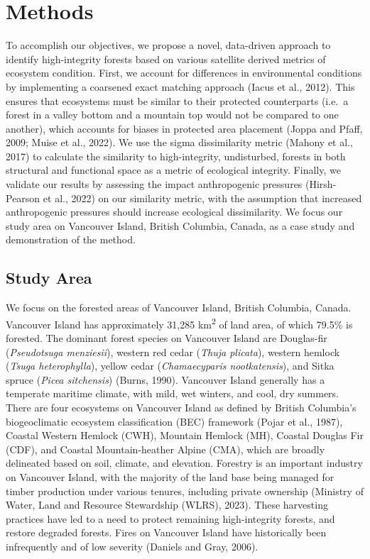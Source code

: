 \documentclass[
]{agujournal2019}
\begin{document}
\section{Methods}\label{methods}

To accomplish our objectives, we propose a novel, data-driven approach
to identify high-integrity forests based on various satellite derived
metrics of ecosystem condition. First, we account for differences in
environmental conditions by implementing a coarsened exact matching
approach (Iacus et al., 2012). This ensures that ecosystems must be
similar to their protected counterparts (i.e.~a forest in a valley
bottom and a mountain top would not be compared to one another), which
accounts for biases in protected area placement (Joppa and Pfaff, 2009;
Muise et al., 2022). We use the sigma dissimilarity metric (Mahony et
al., 2017) to calculate the similarity to high-integrity, undisturbed,
forests in both structural and functional space as a metric of
ecological integrity. Finally, we validate our results by assessing the
impact anthropogenic pressures (Hirsh-Pearson et al., 2022) on our
similarity metric, with the assumption that increased anthropogenic
pressures should increase ecological dissimilarity. We focus our study
area on Vancouver Island, British Columbia, Canada, as a case study and
demonstration of the method.

\subsection{Study Area}\label{sec-study}

We focus on the forested areas of Vancouver Island, British Columbia,
Canada. Vancouver Island has approximately 31,285 km\textsuperscript{2}
of land area, of which 79.5\% is forested. The dominant forest species
on Vancouver Island are Douglas-fir (\emph{Pseudotsuga menziesii}),
western red cedar (\emph{Thuja plicata}), western hemlock (\emph{Tsuga
heterophylla}), yellow cedar (\emph{Chamaecyparis nootkatensis}), and
Sitka spruce (\emph{Picea sitchensis}) (Burns, 1990). Vancouver Island
generally has a temperate maritime climate, with mild, wet winters, and
cool, dry summers. There are four ecosystems on Vancouver Island as
defined by British Columbia's biogeoclimatic ecosystem classification
(BEC) framework (Pojar et al., 1987), Coastal Western Hemlock (CWH),
Mountain Hemlock (MH), Coastal Douglas Fir (CDF), and Coastal
Mountain-heather Alpine (CMA), which are broadly delineated based on
soil, climate, and elevation. Forestry is an important industry on
Vancouver Island, with the majority of the land base being managed for
timber production under various tenures, including private ownership
(Ministry of Water, Land and Resource Stewardship (WLRS), 2023). These
harvesting practices have led to a need to protect remaining
high-integrity forests, and restore degraded forests. Fires on Vancouver
Island have historically been infrequently and of low severity (Daniels
and Gray, 2006).
\end{document}
